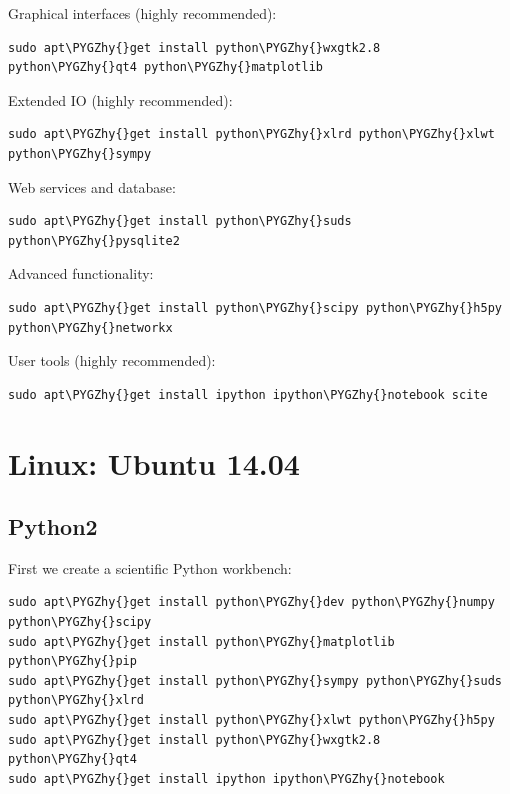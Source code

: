 \documentclass[a4paper,11pt,english]{sphinxmanual}
\def\PYGZhy{\char`\-}
\begin{document}
Graphical interfaces (highly recommended):

\begin{Verbatim}[commandchars=\\\{\}]
sudo apt\PYGZhy{}get install python\PYGZhy{}wxgtk2.8 python\PYGZhy{}qt4 python\PYGZhy{}matplotlib
\end{Verbatim}

Extended IO (highly recommended):

\begin{Verbatim}[commandchars=\\\{\}]
sudo apt\PYGZhy{}get install python\PYGZhy{}xlrd python\PYGZhy{}xlwt python\PYGZhy{}sympy
\end{Verbatim}

Web services and database:

\begin{Verbatim}[commandchars=\\\{\}]
sudo apt\PYGZhy{}get install python\PYGZhy{}suds python\PYGZhy{}pysqlite2
\end{Verbatim}

Advanced functionality:

\begin{Verbatim}[commandchars=\\\{\}]
sudo apt\PYGZhy{}get install python\PYGZhy{}scipy python\PYGZhy{}h5py python\PYGZhy{}networkx
\end{Verbatim}

User tools (highly recommended):

\begin{Verbatim}[commandchars=\\\{\}]
sudo apt\PYGZhy{}get install ipython ipython\PYGZhy{}notebook scite
\end{Verbatim}


\section{Linux: Ubuntu 14.04}
\label{install_doc:linux-ubuntu-14-04}

\subsection{Python2}
\label{install_doc:python2}
First we create a scientific Python workbench:

\begin{Verbatim}[commandchars=\\\{\}]
sudo apt\PYGZhy{}get install python\PYGZhy{}dev python\PYGZhy{}numpy python\PYGZhy{}scipy
sudo apt\PYGZhy{}get install python\PYGZhy{}matplotlib  python\PYGZhy{}pip
sudo apt\PYGZhy{}get install python\PYGZhy{}sympy python\PYGZhy{}suds python\PYGZhy{}xlrd
sudo apt\PYGZhy{}get install python\PYGZhy{}xlwt python\PYGZhy{}h5py
sudo apt\PYGZhy{}get install python\PYGZhy{}wxgtk2.8 python\PYGZhy{}qt4
sudo apt\PYGZhy{}get install ipython ipython\PYGZhy{}notebook
\end{Verbatim}
\end{document}
